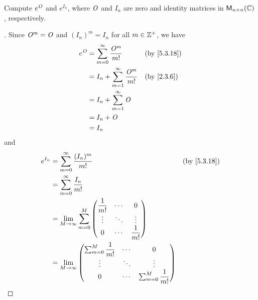 \begin{ex}\label{ex:5.3.20}
  Compute \(e^{\mathit{O}}\) and \(e^{I_n}\), where \(\mathit{O}\) and \(I_n\) are zero and identity matrices in \(\ms[n][n][\C]\), respectively.
\end{ex}

\begin{proof}[]
  Since \(\mathit{O}^m = \mathit{O}\) and \((I_n)^m = I_n\) for all \(m \in \mathbb{Z}^+\), we have
  \begin{align*}
    e^{\zm} & = \sum_{m = 0}^\infty \dfrac{\zm^m}{m!}       &  & \by{5.3.18} \\
            & = I_n + \sum_{m = 1}^\infty \dfrac{\zm^m}{m!} &  & \by{2.3.6}  \\
            & = I_n + \sum_{m = 1}^\infty \zm                                \\
            & = I_n + \zm                                                    \\
            & = I_n
  \end{align*}
  and
  \begin{align*}
    e^{I_n} & = \sum_{m = 0}^\infty \dfrac{(I_n)^m}{m!}                                                                       &  & \by{5.3.18} \\
            & = \sum_{m = 0}^\infty \dfrac{I_n}{m!}                                                                                            \\
            & = \Lim_{M \to \infty} \sum_{m = 0}^M \begin{pmatrix}
                                                     \dfrac{1}{m!} & \cdots & 0             \\
                                                     \vdots        & \ddots & \vdots        \\
                                                     0             & \cdots & \dfrac{1}{m!}
                                                   \end{pmatrix}                                                      \\
            & = \Lim_{M \to \infty} \begin{pmatrix}
                                      \sum_{m = 0}^M  \dfrac{1}{m!} & \cdots & 0                            \\
                                      \vdots                        & \ddots & \vdots                       \\
                                      0                             & \cdots & \sum_{m = 0}^M \dfrac{1}{m!}

\end{pmatrix}
\end{align*}
\end{proof}
